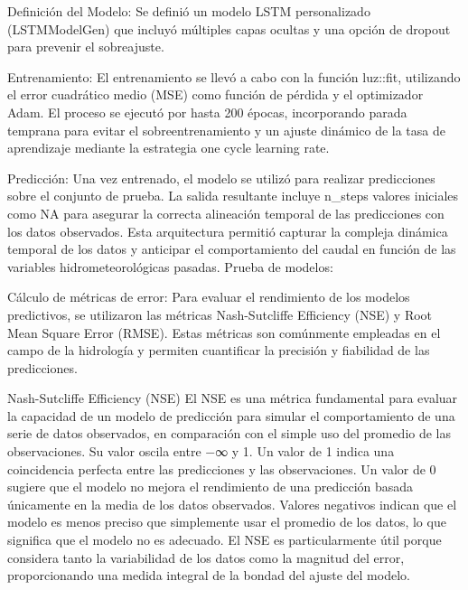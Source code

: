 \documentclass[hess, manuscript]{copernicus}
\begin{document}
Definición del Modelo: Se definió un modelo LSTM personalizado (LSTMModelGen) que incluyó múltiples capas ocultas y una opción de dropout para prevenir el sobreajuste.

Entrenamiento: El entrenamiento se llevó a cabo con la función luz::fit, utilizando el error cuadrático medio (MSE) como función de pérdida y el optimizador Adam. El proceso se ejecutó por hasta 200 épocas, incorporando parada temprana para evitar el sobreentrenamiento y un ajuste dinámico de la tasa de aprendizaje mediante la estrategia one cycle learning rate.

Predicción: Una vez entrenado, el modelo se utilizó para realizar predicciones sobre el conjunto de prueba. La salida resultante incluye n_steps valores iniciales como NA para asegurar la correcta alineación temporal de las predicciones con los datos observados. Esta arquitectura permitió capturar la compleja dinámica temporal de los datos y anticipar el comportamiento del caudal en función de las variables hidrometeorológicas pasadas.
Prueba de modelos:

Cálculo de métricas de error:
Para evaluar el rendimiento de los modelos predictivos, se utilizaron las métricas Nash-Sutcliffe Efficiency (NSE) y Root Mean Square Error (RMSE). Estas métricas son comúnmente empleadas en el campo de la hidrología y permiten cuantificar la precisión y fiabilidad de las predicciones.

Nash-Sutcliffe Efficiency (NSE)
El NSE es una métrica fundamental para evaluar la capacidad de un modelo de predicción para simular el comportamiento de una serie de datos observados, en comparación con el simple uso del promedio de las observaciones. Su valor oscila entre −∞ y 1. Un valor de 1 indica una coincidencia perfecta entre las predicciones y las observaciones. Un valor de 0 sugiere que el modelo no mejora el rendimiento de una predicción basada únicamente en la media de los datos observados. Valores negativos indican que el modelo es menos preciso que simplemente usar el promedio de los datos, lo que significa que el modelo no es adecuado. El NSE es particularmente útil porque considera tanto la variabilidad de los datos como la magnitud del error, proporcionando una medida integral de la bondad del ajuste del modelo.
\end{document}
